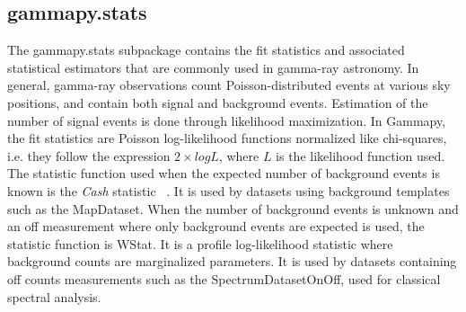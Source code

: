 \subsection{gammapy.stats}
\label{ssec:gammapy-stats}


The gammapy.stats subpackage contains the fit statistics and associated statistical estimators
that are commonly used in gamma-ray astronomy.
In general, gamma-ray observations count Poisson-distributed events at various sky positions,
and contain both signal and background events. Estimation of the number of signal events is done
through likelihood maximization. In Gammapy, the fit statistics are Poisson log-likelihood functions
normalized like chi-squares, i.e. they follow the expression $2 \times log L$, where $L$ is the
likelihood function used.
The statistic function used when the expected number of background events is known
is the \emph{Cash} statistic ~\citep{Cash}. It is used by datasets using background
templates such as the MapDataset. When the number of background events is unknown and
an off measurement where only background events are expected is used, the statistic function
is WStat. It is a profile log-likelihood statistic where background counts are
marginalized parameters. It is used by datasets containing off counts measurements
such as the SpectrumDatasetOnOff, used for classical spectral analysis.

